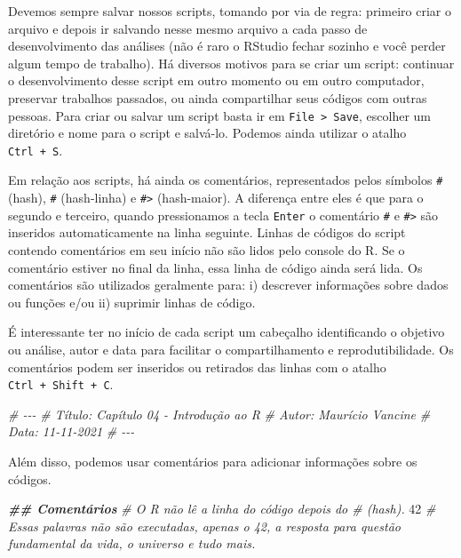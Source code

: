 \documentclass[
]{article}
\newenvironment{Shaded}{\begin{snugshade}}{\end{snugshade}}
\newcommand{\CommentTok}[1]{\textcolor[rgb]{0.56,0.35,0.01}{\textit{#1}}}
\newcommand{\DecValTok}[1]{\textcolor[rgb]{0.00,0.00,0.81}{#1}}
\newcommand{\DocumentationTok}[1]{\textcolor[rgb]{0.56,0.35,0.01}{\textbf{\textit{#1}}}}
\begin{document}
Devemos sempre salvar nossos scripts, tomando por via de regra: primeiro criar o arquivo e depois ir salvando nesse mesmo arquivo a cada passo de desenvolvimento das análises (não é raro o RStudio fechar sozinho e você perder algum tempo de trabalho). Há diversos motivos para se criar um script: continuar o desenvolvimento desse script em outro momento ou em outro computador, preservar trabalhos passados, ou ainda compartilhar seus códigos com outras pessoas. Para criar ou salvar um script basta ir em \texttt{File\ \textgreater{}\ Save}, escolher um diretório e nome para o script e salvá-lo. Podemos ainda utilizar o atalho \texttt{Ctrl\ +\ S}.

Em relação aos scripts, há ainda os comentários, representados pelos símbolos \texttt{\#} (hash), \texttt{\#\textquotesingle{}} (hash-linha) e \texttt{\#\textgreater{}} (hash-maior). A diferença entre eles é que para o segundo e terceiro, quando pressionamos a tecla \texttt{Enter} o comentário \texttt{\#\textquotesingle{}} e \texttt{\#\textgreater{}} são inseridos automaticamente na linha seguinte. Linhas de códigos do script contendo comentários em seu início não são lidos pelo console do R. Se o comentário estiver no final da linha, essa linha de código ainda será lida. Os comentários são utilizados geralmente para: i) descrever informações sobre dados ou funções e/ou ii) suprimir linhas de código.

É interessante ter no início de cada script um cabeçalho identificando o objetivo ou análise, autor e data para facilitar o compartilhamento e reprodutibilidade. Os comentários podem ser inseridos ou retirados das linhas com o atalho \texttt{Ctrl\ +\ Shift\ +\ C}.

\begin{Shaded}
\begin{Highlighting}[]
\CommentTok{\#\textquotesingle{} {-}{-}{-}}
\CommentTok{\#\textquotesingle{} Título: Capítulo 04 {-} Introdução ao R}
\CommentTok{\#\textquotesingle{} Autor: Maurício Vancine}
\CommentTok{\#\textquotesingle{} Data: 11{-}11{-}2021}
\CommentTok{\#\textquotesingle{} {-}{-}{-}}
\end{Highlighting}
\end{Shaded}

Além disso, podemos usar comentários para adicionar informações sobre os códigos.

\begin{Shaded}
\begin{Highlighting}[]
\DocumentationTok{\#\# Comentários}
\CommentTok{\# O R não lê a linha do código depois do \# (hash).}
\DecValTok{42} \CommentTok{\# Essas palavras não são executadas, apenas o 42, a resposta para questão fundamental da vida, o universo e tudo mais.}
\end{Highlighting}
\end{Shaded}
\end{document}
